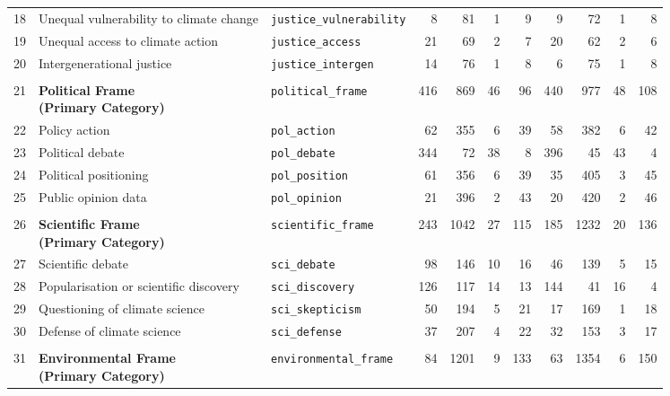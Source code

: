 \begin{longtable}{p{0.5cm}p{4.0cm}p{3.0cm}rrrrrrrr}
18 & Unequal vulnerability to climate change & \texttt{justice\_vulnerability} & 8 & 81 & 1 & 9 & 9 & 72 & 1 & 8 \\
19 & Unequal access to climate action & \texttt{justice\_access} & 21 & 69 & 2 & 7 & 20 & 62 & 2 & 6 \\
20 & Intergenerational justice & \texttt{justice\_intergen} & 14 & 76 & 1 & 8 & 6 & 75 & 1 & 8 \\
\midrule
\rowcolor{gray!8}
\multicolumn{11}{l}{\textit{Political Frame}} \\
\midrule
21 & \textbf{Political Frame\newline (Primary Category)} & \texttt{political\_frame} & 416 & 869 & 46 & 96 & 440 & 977 & 48 & 108 \\
\cmidrule(lr){1-11}
22 & Policy action & \texttt{pol\_action} & 62 & 355 & 6 & 39 & 58 & 382 & 6 & 42 \\
23 & Political debate & \texttt{pol\_debate} & 344 & 72 & 38 & 8 & 396 & 45 & 43 & 4 \\
24 & Political positioning & \texttt{pol\_position} & 61 & 356 & 6 & 39 & 35 & 405 & 3 & 45 \\
25 & Public opinion data & \texttt{pol\_opinion} & 21 & 396 & 2 & 43 & 20 & 420 & 2 & 46 \\
\midrule
\rowcolor{gray!8}
\multicolumn{11}{l}{\textit{Scientific Frame}} \\
\midrule
26 & \textbf{Scientific Frame\newline (Primary Category)} & \texttt{scientific\_frame} & 243 & 1042 & 27 & 115 & 185 & 1232 & 20 & 136 \\
\cmidrule(lr){1-11}
27 & Scientific debate & \texttt{sci\_debate} & 98 & 146 & 10 & 16 & 46 & 139 & 5 & 15 \\
28 & Popularisation or scientific discovery & \texttt{sci\_discovery} & 126 & 117 & 14 & 13 & 144 & 41 & 16 & 4 \\
29 & Questioning of climate science & \texttt{sci\_skepticism} & 50 & 194 & 5 & 21 & 17 & 169 & 1 & 18 \\
30 & Defense of climate science & \texttt{sci\_defense} & 37 & 207 & 4 & 22 & 32 & 153 & 3 & 17 \\
\midrule
\rowcolor{gray!8}
\multicolumn{11}{l}{\textit{Environmental Frame}} \\
\midrule
31 & \textbf{Environmental Frame\newline (Primary Category)} & \texttt{environmental\_frame} & 84 & 1201 & 9 & 133 & 63 & 1354 & 6 & 150 \\
\cmidrule(lr){1-11}

\end{longtable}
